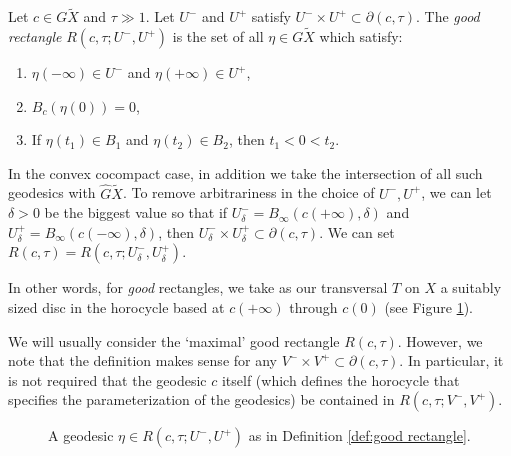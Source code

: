 \begin{defn}\label{def:good rectangle}
Let $c\in G\tilde X$ and $\tau \gg 1$. Let $U^-$ and $U^+$ satisfy $U^- \times U^+ \subset \partial (c, \tau)$. The \emph{good rectangle} $R(c, \tau; U^-, U^+)$ is the set of all $\eta \in G \tilde X$ which satisfy:
\begin{enumerate}
\item $\eta(-\infty) \in U^-$ and $\eta(+\infty) \in U^+$,
\item $B_{c}(\eta(0)) = 0$,
\item If $\eta(t_1)\in B_1$ and $\eta(t_2)\in B_2$, then $t_1<0<t_2$.
\end{enumerate}
In the convex cocompact case, in addition we take the intersection of all such geodesics with $\hat G\tilde X$. To remove arbitrariness in the choice of $U^-, U^+$, we can let $\delta>0$ be the biggest value so that if $U^-_\delta = B_\infty(c(+\infty), \delta)$ and $U^+_\delta = B_\infty(c(-\infty), \delta)$, then $U^-_\delta \times U^+_\delta \subset \partial(c, \tau)$. We can set $R(c, \tau)= R(c, \tau; U^-_\delta, U^+_\delta)$.
\end{defn}

In other words, for \emph{good} rectangles, we take as our transversal $T$ on $X$ a suitably sized disc in the horocycle based at $c(+\infty)$ through $c(0)$ (see Figure \ref{fig:good rectangle}).

We will usually consider the `maximal' good rectangle $R(c, \tau)$. However, we note that the definition makes sense for any $V^- \times V^+ \subset \partial (c, \tau)$. In particular, it is not required that the geodesic $c$ itself (which defines the horocycle that specifies the parameterization of the geodesics) be contained in $R(c, \tau; V^-, V^+)$.

\begin{figure}[htb]
\caption{A geodesic $\eta\in R(c, \tau ; U^-,U^+)$ as in Definition \ref{def:good rectangle}.}\label{fig:good rectangle}
\end{figure}

